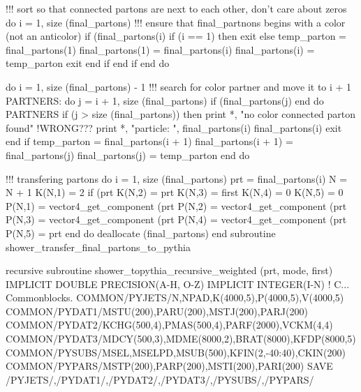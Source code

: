     !!! sort so that connected partons are next to each other, don't care about zeros
    do i = 1, size (final_partons)
       !!! ensure that final_partnons begins with a color (not an anticolor)
       if (final_partons(i)%
          if (i == 1) then
             exit
          else
             temp_parton = final_partons(1)
             final_partons(1) = final_partons(i)
             final_partons(i) = temp_parton
             exit
          end if
       end if
    end do

    do i = 1, size (final_partons) - 1
       !!! search for color partner and move it to i + 1
       PARTNERS: do j = i + 1, size (final_partons)
          if (final_partons(j)%
       end do PARTNERS
       if (j > size (final_partons)) then
          print *, "no color connected parton found" !WRONG???
          print *, "particle: ", final_partons(i)%
               final_partons(i)%
          exit
       end if
       temp_parton = final_partons(i + 1)
       final_partons(i + 1) = final_partons(j)
       final_partons(j) = temp_parton
    end do

    !!! transfering partons
    do i = 1, size (final_partons)
       prt = final_partons(i)
       N = N + 1
       K(N,1) = 2
       if (prt%
       K(N,2) = prt%
       K(N,3) = first
       K(N,4) = 0
       K(N,5) = 0
       P(N,1) = vector4_get_component (prt%
       P(N,2) = vector4_get_component (prt%
       P(N,3) = vector4_get_component (prt%
       P(N,4) = vector4_get_component (prt%
       P(N,5) = prt%
    end do
    deallocate (final_partons)
  end subroutine shower_transfer_final_partons_to_pythia

\eatline
\nwendcode{}\nwdocspar
\nwenddocs{}\plusendmoddef
  recursive subroutine shower_topythia_recursive_weighted (prt, mode, first)
    IMPLICIT DOUBLE PRECISION(A-H, O-Z)
    IMPLICIT INTEGER(I-N)
    !    C...  Commonblocks.
    COMMON/PYJETS/N,NPAD,K(4000,5),P(4000,5),V(4000,5)
    COMMON/PYDAT1/MSTU(200),PARU(200),MSTJ(200),PARJ(200)
    COMMON/PYDAT2/KCHG(500,4),PMAS(500,4),PARF(2000),VCKM(4,4)
    COMMON/PYDAT3/MDCY(500,3),MDME(8000,2),BRAT(8000),KFDP(8000,5)
    COMMON/PYSUBS/MSEL,MSELPD,MSUB(500),KFIN(2,-40:40),CKIN(200)
    COMMON/PYPARS/MSTP(200),PARP(200),MSTI(200),PARI(200)
    SAVE /PYJETS/,/PYDAT1/,/PYDAT2/,/PYDAT3/,/PYSUBS/,/PYPARS/


